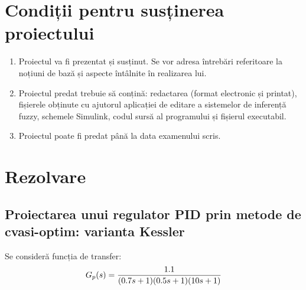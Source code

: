 \documentclass[11pt]{article}
\newcommand{\EqRow}{\vspace{1.5mm}}
\begin{document}
\section{Condiții pentru susținerea proiectului}
\begin{enumerate}[label=\alph*)]
	\item Proiectul va fi prezentat și susținut. Se vor adresa întrebări referitoare la noțiuni de bază și aspecte întâlnite în realizarea lui.
	\item Proiectul predat trebuie să conțină: redactarea (format electronic și printat), fișierele obținute cu ajutorul aplicației de editare a sistemelor de inferență fuzzy, schemele Simulink, codul sursă al programului și fișierul executabil.
	\item Proiectul poate fi predat până la data examenului scris.
\end{enumerate}
\newpage
\section{Rezolvare}
\subsection{Proiectarea unui regulator PID prin metode de cvasi-optim: varianta Kessler}
Se consideră funcția de transfer:
\EqRow
\begin{equation}
G_p(s)=\frac{1.1}{(0.7s+1)(0.5s+1)(10s+1)}
\EqRow
\end{equation}
\end{document}
